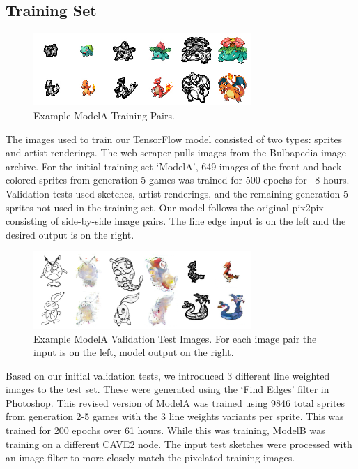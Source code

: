 \documentclass[sigchi]{acmart}
\begin{document}
\subsection{Training Set}

\begin{figure}[h]
\includegraphics[width=3.25in]{figures/ModelA-TrainingPairs.jpg}
\caption{Example ModelA Training Pairs.}
\end{figure}

The images used to train our TensorFlow model consisted of two types: sprites and artist renderings. The web-scraper pulls images from the Bulbapedia image archive. For the initial training set ‘ModelA', 649 images of the front and back colored sprites from generation 5 games was trained for 500 epochs for ~8 hours. Validation tests used sketches, artist renderings, and the remaining generation 5 sprites not used in the training set. Our model follows the original pix2pix consisting of side-by-side image pairs. The line edge input is on the left and the desired output is on the right.

\begin{figure}[h]
\includegraphics[width=3.25in]{figures/ModelA-Valid-649sprite-500epoch.jpg}
\caption{Example ModelA Validation Test Images. For each image pair the input is on the left, model output on the right.}
\end{figure}

Based on our initial validation tests, we introduced 3 different line weighted images to the test set. These were generated using the ‘Find Edges’ filter in Photoshop. This revised version of ModelA was trained using 9846 total sprites from generation 2-5 games with the 3 line weights variants per sprite. This was trained for 200 epochs over 61 hours. While this was training, ModelB was training on a different CAVE2 node. The input test sketches were processed with an image filter to more closely match the pixelated training images.
\end{document}
